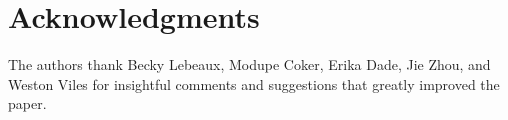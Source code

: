 \documentclass[10pt,letterpaper]{article}
\providecommand{\DIFdelbegin}{} %
\newcommand{\DIFscaledelfig}{0.5}
\newlength{\DIFdelgraphicswidth} %
\newlength{\DIFdelgraphicsheight} %
\newcommand{\DIFdelincludegraphics}[2][]{%
\sbox{\DIFdelgraphicsbox}{\DIFOincludegraphics[#1]{#2}}%
\settoboxwidth{\DIFdelgraphicswidth}{\DIFdelgraphicsbox} %
\settoboxtotalheight{\DIFdelgraphicsheight}{\DIFdelgraphicsbox} %
\scalebox{\DIFscaledelfig}{%
\parbox[b]{\DIFdelgraphicswidth}{\usebox{\DIFdelgraphicsbox}\\[-\baselineskip] \rule{\DIFdelgraphicswidth}{0em}}\llap{\resizebox{\DIFdelgraphicswidth}{\DIFdelgraphicsheight}{%
\setlength{\unitlength}{\DIFdelgraphicswidth}%
\begin{picture}(1,1)%
\thicklines\linethickness{2pt} %
{\color[rgb]{1,0,0}\put(0,0){\framebox(1,1){}}}%
{\color[rgb]{1,0,0}\put(0,0){\line( 1,1){1}}}%
{\color[rgb]{1,0,0}\put(0,1){\line(1,-1){1}}}%
\end{picture}%
}\hspace*{3pt}}} %
} %
\DeclareRobustCommand{\DIFdelbegin}{\DIFOdelbegin \let\includegraphics\DIFdelincludegraphics} %
\begin{document}
\section*{Acknowledgments}
The authors thank Becky Lebeaux, Modupe Coker, Erika Dade, Jie Zhou, and Weston Viles for insightful comments and suggestions that greatly improved the paper. 

\nolinenumbers
%
%
% 

\DIFdelbegin %
\end{document}

